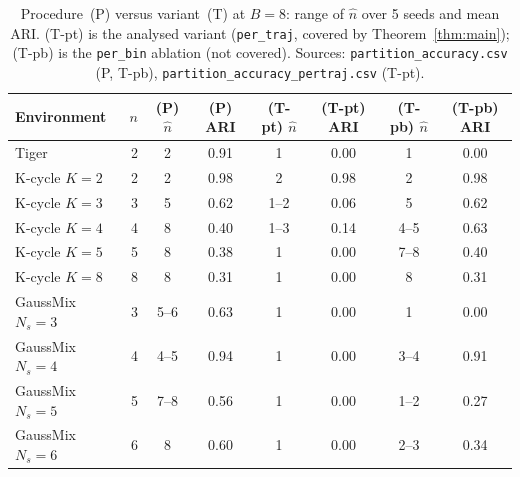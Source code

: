 \documentclass[10pt]{article}
\begin{document}
\begin{table}[t]
\centering
\small
\caption{Procedure~(P) versus variant~(T) at $B=8$: range of $\hat n$ over 5 seeds and
  mean ARI.  (T-pt) is the analysed variant (\texttt{per\_traj}, covered by
  Theorem~\ref{thm:main}); (T-pb) is the \texttt{per\_bin} ablation (not covered).
  Sources: \texttt{partition\_accuracy.csv} (P, T-pb),
  \texttt{partition\_accuracy\_pertraj.csv} (T-pt).}
\label{tab:variantT8}
\begin{tabular}{lrcccccc}
\toprule
Environment & $n$ & (P) $\hat n$ & (P) ARI & (T-pt) $\hat n$ & (T-pt) ARI & (T-pb) $\hat n$ & (T-pb) ARI \\
\midrule
Tiger & 2 & 2 & 0.91 & 1 & 0.00 & 1 & 0.00 \\
K-cycle $K{=}2$ & 2 & 2 & 0.98 & 2 & 0.98 & 2 & 0.98 \\
K-cycle $K{=}3$ & 3 & 5 & 0.62 & 1--2 & 0.06 & 5 & 0.62 \\
K-cycle $K{=}4$ & 4 & 8 & 0.40 & 1--3 & 0.14 & 4--5 & 0.63 \\
K-cycle $K{=}5$ & 5 & 8 & 0.38 & 1 & 0.00 & 7--8 & 0.40 \\
K-cycle $K{=}8$ & 8 & 8 & 0.31 & 1 & 0.00 & 8 & 0.31 \\
GaussMix $N_s{=}3$ & 3 & 5--6 & 0.63 & 1 & 0.00 & 1 & 0.00 \\
GaussMix $N_s{=}4$ & 4 & 4--5 & 0.94 & 1 & 0.00 & 3--4 & 0.91 \\
GaussMix $N_s{=}5$ & 5 & 7--8 & 0.56 & 1 & 0.00 & 1--2 & 0.27 \\
GaussMix $N_s{=}6$ & 6 & 8 & 0.60 & 1 & 0.00 & 2--3 & 0.34 \\
\bottomrule
\end{tabular}
\end{table}
\end{document}

